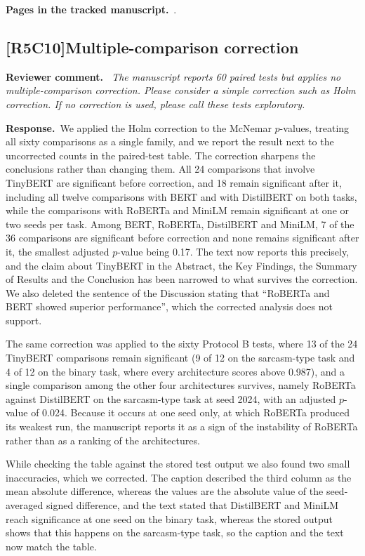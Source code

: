 \documentclass[11pt,a4paper]{article}
\newcommand{\comment}[3]{\subsection*{\textcolor{#1}{[#2]}\enspace #3}}
\newenvironment{reviewercomment}{\par\noindent\textbf{Reviewer comment.}\itshape\ }{\par}
\newcommand{\response}{\par\noindent\textbf{Response.}\ }
\newcommand{\where}[1]{\par\noindent\textbf{Pages in the tracked manuscript.}\ \rvpages[M-]{#1}.}
\begin{document}
\where{R5C9}

\comment{rvFive}{R5C10}{Multiple-comparison correction}
\begin{reviewercomment}
The manuscript reports 60 paired tests but applies no multiple-comparison correction. Please consider a simple correction such as Holm correction. If no correction is used, please call these tests exploratory.
\end{reviewercomment}
\response We applied the Holm correction to the McNemar $p$-values, treating all sixty comparisons as a single family, and we report the result next to the uncorrected counts in the paired-test table. The correction sharpens the conclusions rather than changing them. All 24 comparisons that involve TinyBERT are significant before correction, and 18 remain significant after it, including all twelve comparisons with BERT and with DistilBERT on both tasks, while the comparisons with RoBERTa and MiniLM remain significant at one or two seeds per task. Among BERT, RoBERTa, DistilBERT and MiniLM, 7 of the 36 comparisons are significant before correction and none remains significant after it, the smallest adjusted $p$-value being 0.17. The text now reports this precisely, and the claim about TinyBERT in the Abstract, the Key Findings, the Summary of Results and the Conclusion has been narrowed to what survives the correction. We also deleted the sentence of the Discussion stating that ``RoBERTa and BERT showed superior performance'', which the corrected analysis does not support.

The same correction was applied to the sixty Protocol B tests, where 13 of the 24 TinyBERT comparisons remain significant (9 of 12 on the sarcasm-type task and 4 of 12 on the binary task, where every architecture scores above 0.987), and a single comparison among the other four architectures survives, namely RoBERTa against DistilBERT on the sarcasm-type task at seed 2024, with an adjusted $p$-value of 0.024. Because it occurs at one seed only, at which RoBERTa produced its weakest run, the manuscript reports it as a sign of the instability of RoBERTa rather than as a ranking of the architectures.

While checking the table against the stored test output we also found two small inaccuracies, which we corrected. The caption described the third column as the mean absolute difference, whereas the values are the absolute value of the seed-averaged signed difference, and the text stated that DistilBERT and MiniLM reach significance at one seed on the binary task, whereas the stored output shows that this happens on the sarcasm-type task, so the caption and the text now match the table.
\end{document}
